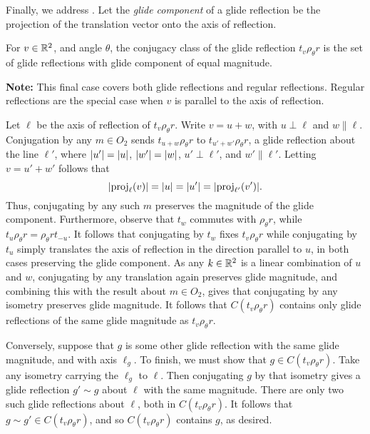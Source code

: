 \documentclass{scrartcl}
\begin{document}
\begin{solution}
    Finally, we address . Let the \textit{glide component} of a glide reflection be the projection of the translation vector onto the axis of reflection.
    \begin{lemma}
    For $v\in \mathbb R^2$, and angle $\theta$, the conjugacy class of the glide reflection $t_v\rho_\theta r$ is the set of glide reflections with glide component of equal magnitude.
    \end{lemma}
    \textbf{Note:} This final case covers both glide reflections and regular reflections. Regular reflections are the special case when $v$ is parallel to the axis of reflection.
    \begin{tproof}
    Let $\ell$ be the axis of reflection of $t_v\rho_\theta r$. Write $v=u+w$, with $u\perp \ell$ and $w\parallel \ell$. Conjugation by any $m\in O_2$ sends $t_{u+w}\rho_\theta r$ to $t_{u'+w'}\rho_\theta r$, a glide reflection about the line $\ell'$, where $\lvert u'\rvert=\lvert u\rvert$, $\lvert w'\rvert=\lvert w\rvert$, $u'\perp \ell'$, and $w'\parallel \ell'$. Letting $v=u'+w'$ follows that
    \[\lvert\operatorname{proj}_\ell(v)\rvert=\lvert u\rvert=\lvert u'\rvert=\lvert\operatorname{proj}_{\ell'}(v')\rvert.\] Thus, conjugating by any such $m$ preserves the magnitude of the glide component. Furthermore, observe that $t_w$ commutes with $\rho_\theta r$, while $t_u\rho_\theta r=\rho_\theta rt_{-u}$. It follows that conjugating by $t_w$ fixes $t_v\rho_\theta r$ while conjugating by $t_u$ simply translates the axis of reflection in the direction parallel to $u$, in both cases preserving the glide component. As any $k\in \mathbb R^2$ is a linear combination of $u$ and $w$, conjugating by any translation again preserves glide magnitude, and combining this with the result about $m\in O_2$, gives that conjugating by any isometry preserves glide magnitude. It follows that $C(t_v\rho_\theta r)$ contains only glide reflections of the same glide magnitude as $t_v\rho_\theta r$.
    
    Conversely, suppose that $g$ is some other glide reflection with the same glide magnitude, and with axis $\ell_g$. To finish, we must show that $g\in C(t_v\rho_\theta r)$. Take any isometry carrying the $\ell_g$ to $\ell$. Then conjugating $g$ by that isometry gives a glide reflection $g'\sim g$ about $\ell$ with the same magnitude. There are only two such glide reflections about $\ell$, both in $C(t_v\rho_\theta r)$. It follows that $g\sim g'\in C(t_v\rho_\theta r)$, and so $C(t_v\rho_\theta r)$ contains $g$, as desired.
    \end{tproof}


\end{solution}
\end{document}
